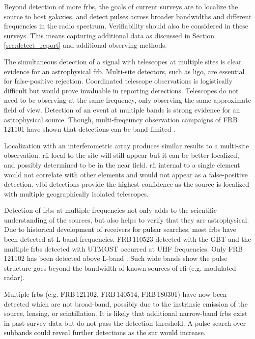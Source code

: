 \documentclass[a4paper,fleqn,usenatbib]{mnras}
\begin{document}
Beyond detection of more \glspl{frb}, the goals of current surveys are to
localize the source to host galaxies, and detect pulses across broader
bandwidths and different frequencies in the radio spectrum. Verifiability should
also be considered in these surveys. This means capturing additional data as
discussed in Section \ref{sec:detect_report} and additional observing methods.

The simultaneous detection of a signal with telescopes at multiple sites is
clear evidence for an astrophysical \gls{frb}.  Multi-site detectors, such as
\gls{ligo}, are essential for false-positive rejection.  Coordinated telescope
observations is logistically difficult but would prove invaluable in reporting
detections.  Telescopes do not need to be observing at the same frequency, only
observing the same approximate field of view. Detection of an event at multiple
bands is strong evidence for an astrophysical source. Though, multi-freqeuncy
observation campaigns of FRB\,121101 have shown that detections can be
band-limited \citep{2017ApJ...850...76L}.

Localization with an interferometric array produces similar results to a
multi-site observation. \gls{rfi} local to the site will still appear but it can
be better localized, and possibly determined to be in the near field. \gls{rfi}
internal to a single element would not correlate with other elements and would
not appear as a false-positive detection.  \gls{vlbi} detections provide the
highest confidence as the source is localized with multiple geographically
isolated telescopes.

Detection of \glspl{frb} at multiple frequencies not only adds to the scientific
understanding of the sources, but also helps to verify that they are
astrophysical.  Due to historical development of receivers for pulsar searches,
most \glspl{frb} have been detected at L-band frequencies. FRB\,110523
detected with the GBT and the multiple \glspl{frb} detected with UTMOST occurred
at UHF frequencies.  Only FRB\,121102 has been detected above L-band
\citep{atel10675}.  Such wide bands show the pulse structure goes beyond the
bandwidth of known sources of \gls{rfi} (e.g. modulated radar). 

Multiple \glspl{frb} (e.g. FRB\,121102, FRB\,140514, FRB\,180301) have now been
detected which are not broad-band, possibly due to the instrinsic emission of
the source, lensing, or scintillation. It is likely that additional  narrow-band
\glspl{frb} exist in past survey data but do not pass the detection threshold. A
pulse search over subbands could reveal further detections as the \gls{snr}
would increase.
\end{document}
